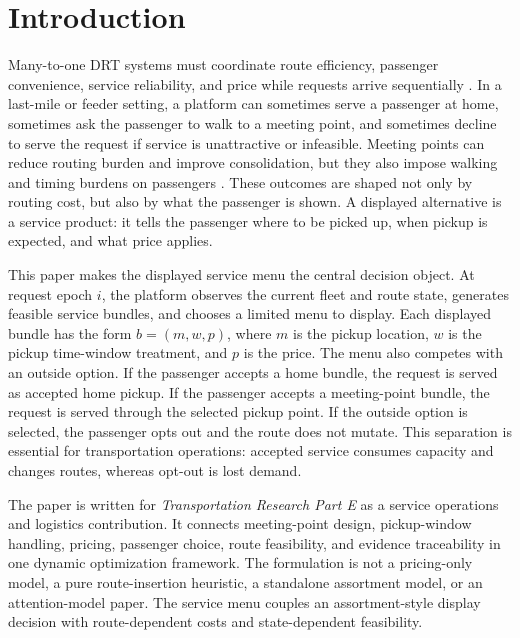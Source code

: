 \documentclass[a4paper,fleqn,review]{cas-dc}
\begin{document}
\maketitle

\section{Introduction}

Many-to-one DRT systems must coordinate route efficiency, passenger
convenience, service reliability, and price while requests arrive sequentially
\citep{cordeau2007dial,ho2018survey}. In a last-mile or feeder setting, a
platform can sometimes serve a passenger at home, sometimes ask the passenger
to walk to a meeting point, and sometimes decline to serve the request if
service is unattractive or infeasible. Meeting points can reduce routing burden
and improve consolidation, but they also impose walking and timing burdens on
passengers \citep{stiglic2015benefits,zheng2019meeting,fielbaum2021ondemand,cortenbach2024}.
These outcomes are shaped not only by routing cost, but also by what the
passenger is shown. A displayed alternative is a service product: it tells the
passenger where to be picked up, when pickup is expected, and what price
applies.

This paper makes the displayed service menu the central decision object. At
request epoch $i$, the platform observes the current fleet and route state,
generates feasible service bundles, and chooses a limited menu to display.
Each displayed bundle has the form $b=(m,w,p)$, where $m$ is the pickup
location, $w$ is the pickup time-window treatment, and $p$ is the price. The
menu also competes with an outside option. If the passenger accepts a home
bundle, the request is served as accepted home pickup. If the passenger accepts
a meeting-point bundle, the request is served through the selected pickup
point. If the outside option is selected, the passenger opts out and the route
does not mutate. This separation is essential for transportation operations:
accepted service consumes capacity and changes routes, whereas opt-out is lost
demand.

The paper is written for \emph{Transportation Research Part E} as a service
operations and logistics contribution. It connects meeting-point design,
pickup-window handling, pricing, passenger choice, route feasibility, and
evidence traceability in one dynamic optimization framework. The formulation
is not a pricing-only model, a pure route-insertion heuristic, a standalone
assortment model, or an attention-model paper. The service menu couples an
assortment-style display decision with route-dependent costs and
state-dependent feasibility.
\end{document}
